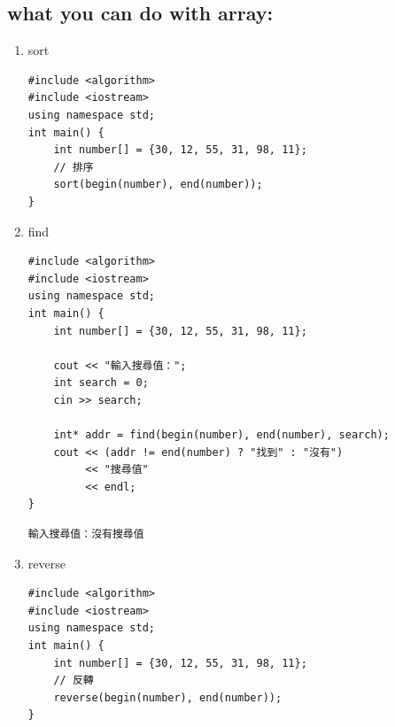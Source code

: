\documentclass[a4paper,12pt]{article}
\begin{document}
\subsection{what you can do with array:}
\label{sec:org5e5dbcc}
\begin{enumerate}
\item sort
\label{sec:org0a4026e}
\lstset{breaklines=true,language=cpp,label= ,caption= ,captionpos=b,firstnumber=1,numbers=left}
\begin{lstlisting}
#include <algorithm>
#include <iostream>
using namespace std;
int main() {
    int number[] = {30, 12, 55, 31, 98, 11};
    // 排序
    sort(begin(number), end(number));
}
\end{lstlisting}

\item find
\label{sec:org8927926}
\lstset{breaklines=true,language=cpp,label= ,caption= ,captionpos=b,firstnumber=1,numbers=left}
\begin{lstlisting}
#include <algorithm>
#include <iostream>
using namespace std;
int main() {
    int number[] = {30, 12, 55, 31, 98, 11};

    cout << "輸入搜尋值：";
    int search = 0;
    cin >> search;

    int* addr = find(begin(number), end(number), search);
    cout << (addr != end(number) ? "找到" : "沒有")
         << "搜尋值"
         << endl;
}
\end{lstlisting}

\begin{verbatim}
輸入搜尋值：沒有搜尋值
\end{verbatim}

\item reverse
\label{sec:orgf7c1242}
\lstset{breaklines=true,language=cpp,label= ,caption= ,captionpos=b,firstnumber=1,numbers=left}
\begin{lstlisting}
#include <algorithm>
#include <iostream>
using namespace std;
int main() {
    int number[] = {30, 12, 55, 31, 98, 11};
    // 反轉
    reverse(begin(number), end(number));
}
\end{lstlisting}
\end{enumerate}
\end{document}
